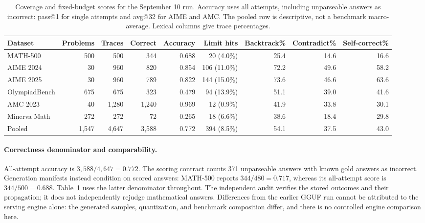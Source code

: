 \begin{table}[t]
\centering
\footnotesize
\caption{Coverage and fixed-budget scores for the September 10 run. Accuracy uses all attempts, including unparseable answers as incorrect: pass@1 for single attempts and avg@32 for AIME and AMC. The pooled row is descriptive, not a benchmark macro-average. Lexical columns give trace percentages. }
\label{tab:qwen-corr-data}
\begin{tabular}{@{}lrrrrrrrr@{}}
\toprule
Dataset & Problems & Traces & Correct & Accuracy & Limit hits & Backtrack\% & Contradict\% & Self-correct\% \\
\midrule
MATH-500 & 500 & 500 & 344 & 0.688 & 20 (4.0\%) & 25.4 & 14.6 & 16.6 \\
AIME 2024 & 30 & 960 & 820 & 0.854 & 106 (11.0\%) & 72.2 & 49.6 & 58.2 \\
AIME 2025 & 30 & 960 & 789 & 0.822 & 144 (15.0\%) & 73.6 & 46.6 & 63.6 \\
OlympiadBench & 675 & 675 & 323 & 0.479 & 94 (13.9\%) & 51.1 & 39.0 & 41.6 \\
AMC 2023 & 40 & 1,280 & 1,240 & 0.969 & 12 (0.9\%) & 41.9 & 33.8 & 30.1 \\
Minerva Math & 272 & 272 & 72 & 0.265 & 18 (6.6\%) & 38.6 & 18.4 & 29.8 \\
\midrule
Pooled & 1,547 & 4,647 & 3,588 & 0.772 & 394 (8.5\%) & 54.1 & 37.5 & 43.0 \\
\bottomrule
\end{tabular}
\end{table}

\paragraph{Correctness denominator and comparability.}
All-attempt accuracy is $3,588/4,647=0.772$. The scoring contract counts 371
unparseable answers with known gold answers as incorrect. Generation manifests
instead condition on scored answers: MATH-500 reports $344/480=0.717$, whereas
its all-attempt score is $344/500=0.688$. Table~\ref{tab:qwen-corr-data} uses
the latter denominator throughout. The independent audit verifies the stored
outcomes and their propagation; it does not independently rejudge mathematical
answers. Differences from the earlier GGUF run cannot be attributed to the
serving engine alone: the generated samples, quantization, and benchmark
composition differ, and there is no controlled engine comparison here.

